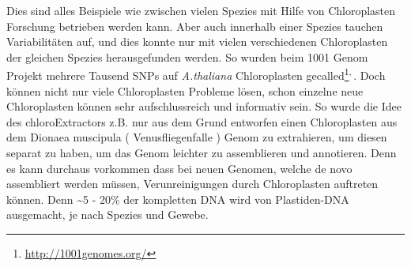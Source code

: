 \documentclass{scrartcl}
\begin{document}
Dies sind alles Beispiele wie zwischen vielen Spezies mit Hilfe von Chloroplasten Forschung betrieben werden kann. Aber auch innerhalb einer Spezies tauchen Variabilitäten auf, und dies konnte nur mit vielen verschiedenen
Chloroplasten der gleichen Spezies herausgefunden werden. So wurden beim 1001 Genom Projekt mehrere Tausend SNPs auf \emph{A.thaliana} Chloroplasten gecalled\footnote{\url{http://1001genomes.org/}}\textsuperscript{,}\,\footnotemark[7]{}. 
Doch können nicht nur viele Chloroplasten Probleme lösen, schon einzelne neue Chloroplasten können sehr aufschlussreich und informativ sein. So wurde die Idee des chloroExtractors z.B. nur aus dem Grund
entworfen einen Chloroplasten aus dem Dionaea muscipula ( Venusfliegenfalle ) Genom zu extrahieren, um diesen separat zu haben, um das Genom leichter zu assemblieren und annotieren. Denn es kann durchaus vorkommen
dass bei neuen Genomen, welche de novo assembliert werden müssen, Verunreinigungen durch Chloroplasten auftreten können. Denn \textasciitilde{}5 - 20\% der kompletten DNA wird von Plastiden-DNA ausgemacht, je nach Spezies und Gewebe\footnotemark[36]{}.
\end{document}
